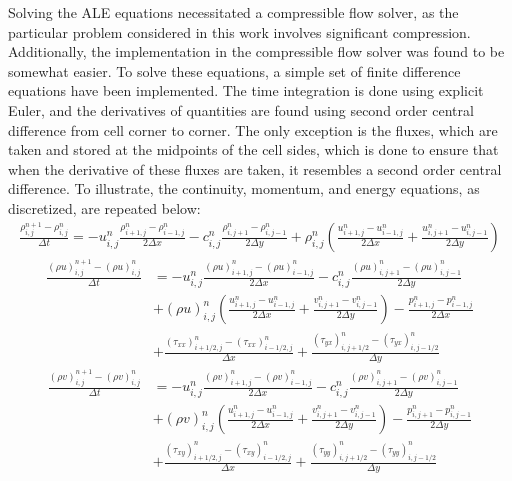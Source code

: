 \documentclass{article}
\begin{document}
Solving the ALE equations necessitated a compressible flow solver, as the particular problem considered in this work involves significant compression.  Additionally, the implementation in the compressible flow solver was found to be somewhat easier.  To solve these equations, a simple set of finite difference equations have been implemented.  The time integration is done using explicit Euler, and the derivatives of quantities are found using second order central difference from cell corner to corner.  The only exception is the fluxes, which are taken and stored at the midpoints of the cell sides, which is done to ensure that when the derivative of these fluxes are taken, it resembles a second order central difference.  To illustrate, the continuity, momentum, and energy equations, as discretized, are repeated below:
\begin{equation}
  \begin{aligned}
    \frac{\rho^{n+1}_{i,j} - \rho^{n}_{i,j}}{\Delta t} = - u^{n}_{i,j} \frac{\rho^{n}_{i+1,j}-\rho^{n}_{i-1,j}}{2\Delta x} - c^{n}_{i,j} \frac{\rho^{n}_{i,j+1}-\rho^{n}_{i,j-1}}{2\Delta y} + \rho^{n}_{i,j} \left(\frac{u^{n}_{i+1,j}-u^{n}_{i-1,j}}{2\Delta x} + \frac{u^{n}_{i,j+1}-u^{n}_{i,j-1}}{2\Delta y}\right)
  \end{aligned}
\end{equation}
\begin{equation}
  \begin{aligned}
    \frac{(\rho u)^{n+1}_{i,j} - (\rho u)^{n}_{i,j}}{\Delta t} &= - u^{n}_{i,j} \frac{(\rho u)^{n}_{i+1,j}-(\rho u)^{n}_{i-1,j}}{2\Delta x} - c^{n}_{i,j} \frac{(\rho u)^{n}_{i,j+1}-(\rho u)^{n}_{i,j-1}}{2\Delta y} \\
    &+ (\rho u)^{n}_{i,j} \left(\frac{u^{n}_{i+1,j}-u^{n}_{i-1,j}}{2\Delta x} + \frac{v^{n}_{i,j+1}-v^{n}_{i,j-1}}{2\Delta y}\right) - \frac{p^{n}_{i+1,j} - p^{n}_{i-1,j}}{2\Delta x} \\
    &+ \frac{(\tau_{xx})^{n}_{i+1/2,j} - (\tau_{xx})^{n}_{i-1/2,j}}{\Delta x} + \frac{(\tau_{yx})^{n}_{i,j+1/2} - (\tau_{yx})^{n}_{i,j-1/2}}{\Delta y}
  \end{aligned}
\end{equation}
\begin{equation}
  \begin{aligned}
    \frac{(\rho v)^{n+1}_{i,j} - (\rho v)^{n}_{i,j}}{\Delta t} &= - u^{n}_{i,j} \frac{(\rho v)^{n}_{i+1,j}-(\rho v)^{n}_{i-1,j}}{2\Delta x} - c^{n}_{i,j} \frac{(\rho v)^{n}_{i,j+1}-(\rho v)^{n}_{i,j-1}}{2\Delta y} \\
    &+ (\rho v)^{n}_{i,j} \left(\frac{u^{n}_{i+1,j}-u^{n}_{i-1,j}}{2\Delta x} + \frac{v^{n}_{i,j+1}-v^{n}_{i,j-1}}{2\Delta y}\right) - \frac{p^{n}_{i,j+1} - p^{n}_{i,j-1}}{2\Delta y} \\
    &+ \frac{(\tau_{xy})^{n}_{i+1/2,j} - (\tau_{xy})^{n}_{i-1/2,j}}{\Delta x} + \frac{(\tau_{yy})^{n}_{i,j+1/2} - (\tau_{yy})^{n}_{i,j-1/2}}{\Delta y}
  \end{aligned}
\end{equation}
\end{document}
